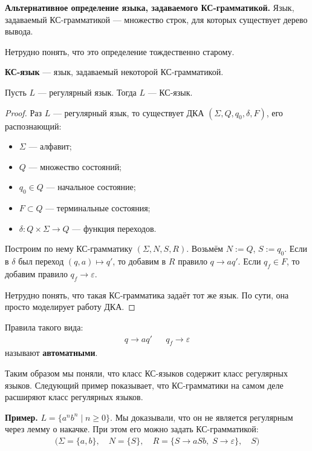 \begin{conj}
    \textbf{Альтернативное определение языка, задаваемого КС-грамматикой.} Язык, задаваемый КС-грамматикой --- множество строк, для которых существует дерево вывода. 
\end{conj}

Нетрудно понять, что это определение тождественно старому.

\begin{conj}
    \textbf{КС-язык} --- язык, задаваемый некоторой КС-грамматикой.
\end{conj}

\begin{theorem}
    Пусть $L$ --- регулярный язык. Тогда $L$ --- КС-язык.
\end{theorem}
\begin{proof}
    Раз $L$ --- регулярный язык, то существует ДКА $(\Sigma, Q, q_0, \delta, F)$, его распознающий:
    \begin{itemize}
        \item $\Sigma$ --- алфавит;
        \item $Q$ --- множество состояний;
        \item $q_0 \in Q$ --- начальное состояние;
        \item $F \subset Q$ --- терминальные состояния;
        \item $\delta : Q \times \Sigma \to Q$ --- функция переходов. 
    \end{itemize}

    Построим по нему КС-грамматику $(\Sigma, N, S, R)$. Возьмём $N := Q$, $S := q_0$. Если в $\delta$ был переход $(q, a) \mapsto q'$, то добавим в $R$ правило $q \to a q'$. Если $q_f \in F$, то добавим правило $q_f \to \varepsilon$. 

    Нетрудно понять, что такая КС-грамматика задаёт тот же язык. По сути, она просто моделирует работу ДКА.
\end{proof}
\begin{conj}
    Правила такого вида:
    \begin{align*}
        q \to a q' && q_f \to \varepsilon
    \end{align*}
    называют \textbf{автоматными}. 
\end{conj}

Таким образом мы поняли, что класс КС-языков содержит класс регулярных языков. Следующий пример показывает, что КС-грамматики на самом деле расширяют класс регулярных языков.

\textbf{Пример.} $L = \{ a^n b^n \mid n \geqslant 0 \}$. Мы доказывали, что он не является регулярным через лемму о накачке. При этом его можно задать КС-грамматикой:
\begin{gather*}
    \bigg(\Sigma = \{ a, b \}, \quad N = \{ S \}, \quad R = \{ S \to aSb, \; S \to \varepsilon \}, \quad S \bigg)
\end{gather*} 

